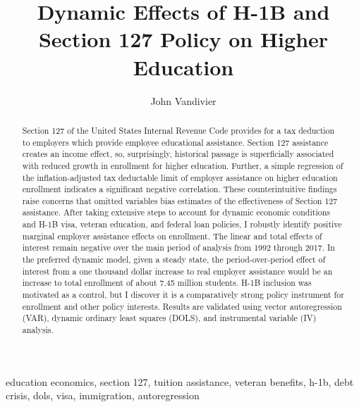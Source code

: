\documentclass[review]{elsarticle}
\begin{document}
\begin{frontmatter}

\title{
    Dynamic Effects of H-1B and Section 127 Policy on Higher Education
}

\author[mymainaddress]{John Vandivier} %
\address[mymainaddress]{4400 University Dr, Fairfax, VA 22030}

\begin{abstract}
    Section 127 of the United States Internal Revenue Code provides for a tax deduction to employers which provide employee educational assistance.
    Section 127 assistance creates an income effect, so, surprisingly,
    historical passage is superficially associated with reduced growth in enrollment for higher education.
    Further, a simple regression of the inflation-adjusted tax deductable limit of employer assistance on higher education enrollment indicates a significant negative correlation.
    These counterintuitive findings raise concerns that omitted variables bias estimates of the effectiveness of Section 127 assistance.
    After taking extensive steps to account for dynamic economic conditions and H-1B visa, veteran education, and federal loan policies,
    I robustly identify positive marginal employer assistance effects on enrollment.
    The linear and total effects of interest remain negative over the main period of analysis from 1992 through 2017.
    In the preferred dynamic model, given a steady state,
    the period-over-period effect of interest from a one thousand dollar increase to real employer assistance would be an increase to total enrollment of about 7.45 million students.
    H-1B inclusion was motivated as a control, but I discover it is a comparatively strong policy instrument for enrollment and other policy interests.
    Results are validated using vector autoregression (VAR), dynamic ordinary least squares (DOLS), and instrumental variable (IV) analysis.
\end{abstract}

\begin{keyword}
education economics, section 127, tuition assistance, veteran benefits, h-1b, debt crisis, dols, visa, immigration, autoregression
\MSC[2010] %
\end{keyword}
\end{frontmatter}
\end{document}
